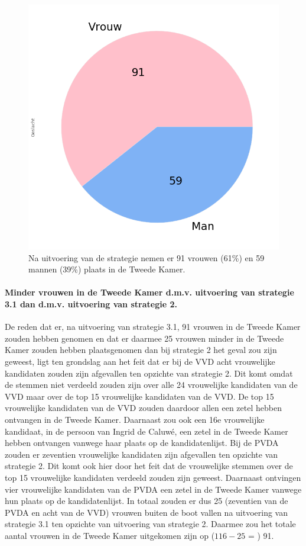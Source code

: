 \begin{figure}[H]
\centering
	\includegraphics[width=0.35\linewidth]{pie_chart_top15_of_topN.png}

			\caption{Na uitvoering van de strategie nemen er 91 vrouwen (61\%) en 59 mannen (39\%) plaats in de Tweede Kamer.}

\label{fig:pcS31V}
\end{figure}

\paragraph{Minder vrouwen in de Tweede Kamer d.m.v. uitvoering van strategie 3.1 dan d.m.v. uitvoering van strategie 2.}
De reden dat er, na uitvoering van strategie 3.1, 91 vrouwen in de Tweede Kamer zouden hebben genomen en dat er daarmee 25 vrouwen minder in de Tweede Kamer zouden hebben plaatsgenomen dan bij strategie 2 het geval zou zijn geweest, ligt ten grondslag aan het feit dat er bij de VVD acht vrouwelijke kandidaten zouden zijn afgevallen ten opzichte van strategie 2. Dit komt omdat de stemmen niet verdeeld zouden zijn over alle 24 vrouwelijke kandidaten van de VVD maar over de top 15 vrouwelijke kandidaten van de VVD. De top 15 vrouwelijke kandidaten van de VVD zouden daardoor allen een zetel hebben ontvangen in de Tweede Kamer. Daarnaast zou ook een 16e vrouwelijke kandidaat, in de persoon van Ingrid de Caluwé, een zetel in de Tweede Kamer hebben ontvangen vanwege haar plaats op de kandidatenlijst. Bij de PVDA zouden er zeventien vrouwelijke kandidaten zijn afgevallen ten opzichte van strategie 2. Dit komt ook hier door het feit dat de vrouwelijke stemmen over de top 15 vrouwelijke kandidaten verdeeld zouden zijn geweest. Daarnaast ontvingen vier vrouwelijke kandidaten van de PVDA een zetel in de Tweede Kamer vanwege hun plaats op de kandidatenlijst. In totaal zouden er dus 25 (zeventien van de PVDA en acht van de VVD) vrouwen buiten de boot vallen na uitvoering van strategie 3.1 ten opzichte van uitvoering van  strategie 2. Daarmee zou het totale aantal vrouwen in de Tweede Kamer uitgekomen zijn op ($116-25$ = ) 91. 



